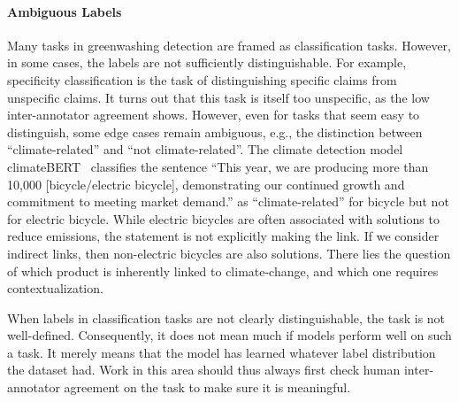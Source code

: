 \paragraph{Ambiguous Labels} Many tasks in greenwashing detection are framed as classification tasks. However, in some cases, the labels are not sufficiently distinguishable.
For example, specificity classification \cite{bingler2023cheaptalkspecificitysentiment} is the task of distinguishing specific claims from unspecific claims. It turns out that this task is itself too unspecific, %
as the low inter-annotator agreement shows. However, even for tasks that seem easy to distinguish, some edge cases remain ambiguous, e.g., the distinction between ``climate-related'' and ``not climate-related''. The climate detection model climateBERT~\cite{bingler2023cheaptalkspecificitysentiment} classifies the sentence ``This year, we are producing more than 10,000 [bicycle/electric bicycle], demonstrating our continued growth and commitment to meeting market demand.'' as ``climate-related'' for bicycle but not for electric bicycle. While electric bicycles are often associated with solutions to reduce emissions, the statement is not explicitly making the link. If we consider indirect links, then non-electric bicycles are also solutions. There lies the question of which product is inherently linked to climate-change, and which one requires contextualization. 


When labels in classification tasks are not clearly distinguishable, the task is not well-defined. Consequently, it does not mean much if models perform well on such a task. It merely means that the model has learned whatever label distribution the dataset had. Work in this area should thus always first check human inter-annotator agreement on the task to make sure it is meaningful.

